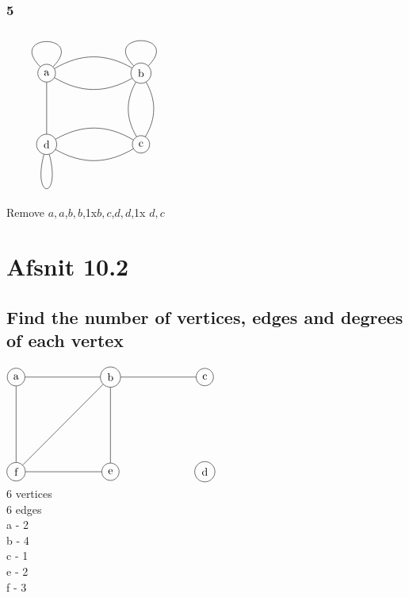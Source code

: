 \documentclass[12pt, a4paper]{report}
\begin{document}
			\subsubsection{5}
				$\begin{tikzpicture}[scale=3]
					\tikzstyle{vertex}=[circle,draw=black]
					\node[vertex](v1) at (0,0.75) {a};
					\node[vertex](v2) at (1,0.75) {b};
					\node[vertex](v3) at (1,0) {c};
					\node[vertex](v4) at (0,0) {d};
   					\draw (v1) to [bend right=-30] (v2);
   					\draw (v1) to [bend right=30] (v2);
   					\draw (v4) to [bend right=-30] (v3);
   					\draw (v4) to [bend right=30] (v3);
					\draw (v1) to (v4);
   					\draw (v2) to [bend left=30, text={"e_3"}] (v3);
   					\draw (v2) to [bend right=30] (v3);
					\draw(v1) to [loop] node {}(v1);
					\draw(v2) to [loop] node {}(v2);
					\draw(v4) to [loop below] node {}(v4);
				\end{tikzpicture}$\\
				Remove $a,a$,$b,b$,1x$b,c$,$d,d$,1x $d,c$
	\section{Afsnit 10.2}
		\subsection{Find the number of vertices, edges and degrees of each vertex}
			$\begin{tikzpicture}[scale=3]
					\tikzstyle{vertex}=[circle,draw=black]
					\node[vertex](v1) at (0,0){f};
					\node[vertex](v2) at (1,0){e};
					\node[vertex](v4) at (0,1) {a};
					\node[vertex](v3) at (1,1) {b};
					\node[vertex](v5) at (2,1) {c};
					\node[vertex](v6) at (2,0) {d};
					\path[-]
						(v2) edge node {}(v3)
						(v4) edge node {}(v1)
						(v3) edge node {}(v4)
						(v3) edge node {}(v1)
						(v1) edge node {} (v2)
						(v3) edge node {} (v5);
				\end{tikzpicture}$\\
				6 vertices\\
				6 edges\\
				a - 2\\
				b - 4\\
				c - 1\\
				e - 2\\
				f - 3
		\setcounter{subsection}{6}
\end{document}
